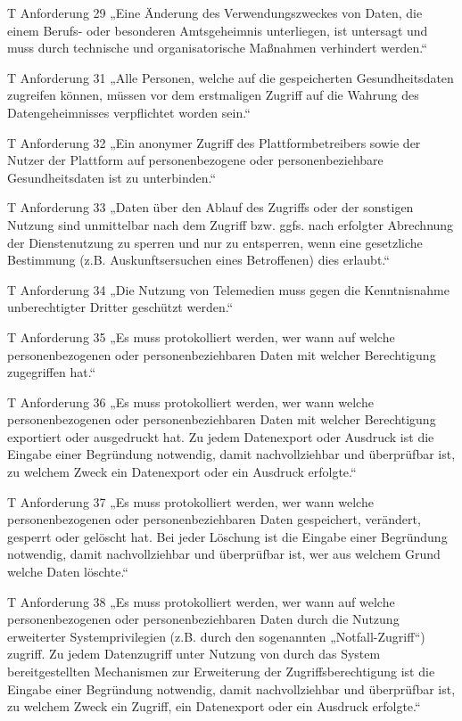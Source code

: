 T Anforderung 29
„Eine Änderung des Verwendungszweckes von Daten, die einem Berufs- oder besonderen Amtsgeheimnis unterliegen, ist untersagt und muss durch technische und organisatorische Maßnahmen verhindert werden.“

T Anforderung 31
„Alle Personen, welche auf die gespeicherten Gesundheitsdaten zugreifen können, müssen vor dem erstmaligen Zugriff auf die Wahrung des Datengeheimnisses verpflichtet worden sein.“

T Anforderung 32
„Ein anonymer Zugriff des Plattformbetreibers sowie der Nutzer der Plattform auf personenbezogene oder personenbeziehbare Gesundheitsdaten ist zu unterbinden.“

T Anforderung 33
„Daten über den Ablauf des Zugriffs oder der sonstigen Nutzung sind unmittelbar nach dem Zugriff bzw. ggfs. nach erfolgter Abrechnung der Dienstenutzung zu sperren und nur zu entsperren, wenn eine gesetzliche Bestimmung (z.B. Auskunftsersuchen eines Betroffenen) dies erlaubt.“

T Anforderung 34
„Die Nutzung von Telemedien muss gegen die Kenntnisnahme unberechtigter Dritter geschützt werden.“

T Anforderung 35
„Es muss protokolliert werden, wer wann auf welche personenbezogenen oder personenbeziehbaren Daten mit welcher Berechtigung zugegriffen hat.“

T Anforderung 36
„Es muss protokolliert werden, wer wann welche personenbezogenen oder personenbeziehbaren Daten mit welcher Berechtigung exportiert oder ausgedruckt hat. Zu jedem Datenexport oder Ausdruck ist die Eingabe einer Begründung notwendig, damit nachvollziehbar und überprüfbar ist, zu welchem Zweck ein Datenexport oder ein Ausdruck erfolgte.“

T Anforderung 37
„Es muss protokolliert werden, wer wann welche personenbezogenen oder personenbeziehbaren Daten gespeichert, verändert, gesperrt oder gelöscht hat. Bei jeder Löschung ist die Eingabe einer Begründung notwendig, damit nachvollziehbar und überprüfbar ist, wer aus welchem Grund welche Daten löschte.“

T Anforderung 38
„Es muss protokolliert werden, wer wann auf welche personenbezogenen oder personenbeziehbaren Daten durch die Nutzung erweiterter Systemprivilegien (z.B. durch den sogenannten „Notfall-Zugriff“) zugriff. Zu jedem Datenzugriff unter Nutzung von durch das System bereitgestellten Mechanismen zur Erweiterung der Zugriffsberechtigung ist die Eingabe einer Begründung notwendig, damit nachvollziehbar und überprüfbar ist, zu welchem Zweck ein Zugriff, ein Datenexport oder ein Ausdruck erfolgte.“

